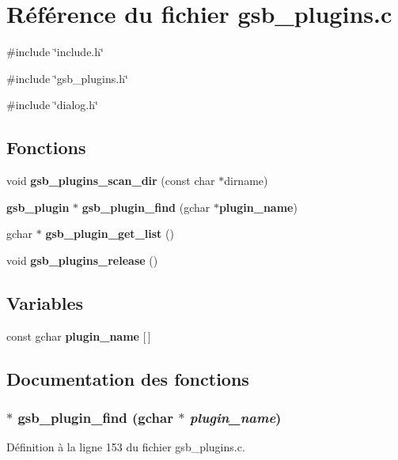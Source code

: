 \section{Référence du fichier gsb\_\-plugins.c}
\label{gsb__plugins_8c}
{\ttfamily \#include \char`\"{}include.h\char`\"{}}\par
{\ttfamily \#include \char`\"{}gsb\_\-plugins.h\char`\"{}}\par
{\ttfamily \#include \char`\"{}dialog.h\char`\"{}}\par
\subsection*{Fonctions}
\begin{DoxyCompactItemize}
\item 
void {\bf gsb\_\-plugins\_\-scan\_\-dir} (const char $\ast$dirname)
\item 
{\bf gsb\_\-plugin} $\ast$ {\bf gsb\_\-plugin\_\-find} (gchar $\ast${\bf plugin\_\-name})
\item 
gchar $\ast$ {\bf gsb\_\-plugin\_\-get\_\-list} ()
\item 
void {\bf gsb\_\-plugins\_\-release} ()
\end{DoxyCompactItemize}
\subsection*{Variables}
\begin{DoxyCompactItemize}
\item 
const gchar {\bf plugin\_\-name} [$\,$]
\end{DoxyCompactItemize}


\subsection{Documentation des fonctions}
\subsubsection[{gsb\_\-plugin\_\-find}]{$\ast$ gsb\_\-plugin\_\-find (gchar $\ast$ {\em plugin\_\-name})}\label{gsb__plugins_8c_ae8e42c4d6f667c7e023e555d604f42cf}


Définition à la ligne 153 du fichier gsb\_\-plugins.c.

